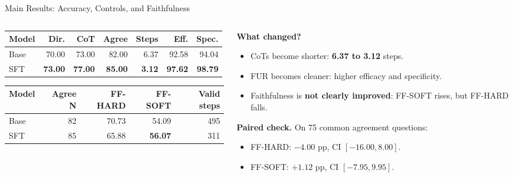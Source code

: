\documentclass[aspectratio=169,10pt]{beamer}
\newcommand{\good}[1]{\textcolor{mainblue}{\textbf{#1}}}
\newcommand{\warn}[1]{\textcolor{accentred}{\textbf{#1}}}
\begin{document}
\begin{frame}{Main Results: Accuracy, Controls, and Faithfulness}
\scriptsize
\begin{columns}[T,onlytextwidth]
  \begin{column}{0.62\textwidth}
    \centering
    \begin{tabular}{lrrrrrr}
      \toprule
      Model & Dir. & CoT & Agree & Steps & Eff. & Spec. \\
      \midrule
      Base & 70.00 & 73.00 & 82.00 & 6.37 & 92.58 & 94.04 \\
      SFT & \good{73.00} & \good{77.00} & \good{85.00} & \good{3.12} & \good{97.62} & \good{98.79} \\
      \bottomrule
    \end{tabular}

    \vspace{0.7em}
    \begin{tabular}{lrrrr}
      \toprule
      Model & Agree N & FF-HARD & FF-SOFT & Valid steps \\
      \midrule
      Base & 82 & 70.73 & 54.09 & 495 \\
      SFT & 85 & 65.88 & \good{56.07} & 311 \\
      \bottomrule
    \end{tabular}
  \end{column}

  \begin{column}{0.34\textwidth}
    \textbf{What changed?}
    \begin{itemize}
      \setlength{\itemsep}{0.35em}
      \item CoTs become shorter: \good{6.37 to 3.12} steps.
      \item FUR becomes cleaner: higher efficacy and specificity.
      \item Faithfulness is \warn{not clearly improved}: FF-SOFT rises, but FF-HARD falls.
    \end{itemize}

    \vspace{0.2em}
    \textbf{Paired check.}
    On 75 common agreement questions:
    \begin{itemize}
      \setlength{\itemsep}{0.2em}
      \item FF-HARD: \(-4.00\) pp, CI \([-16.00, 8.00]\).
      \item FF-SOFT: \(+1.12\) pp, CI \([-7.95, 9.95]\).
    \end{itemize}
  \end{column}
\end{columns}
\end{frame}
\end{document}
